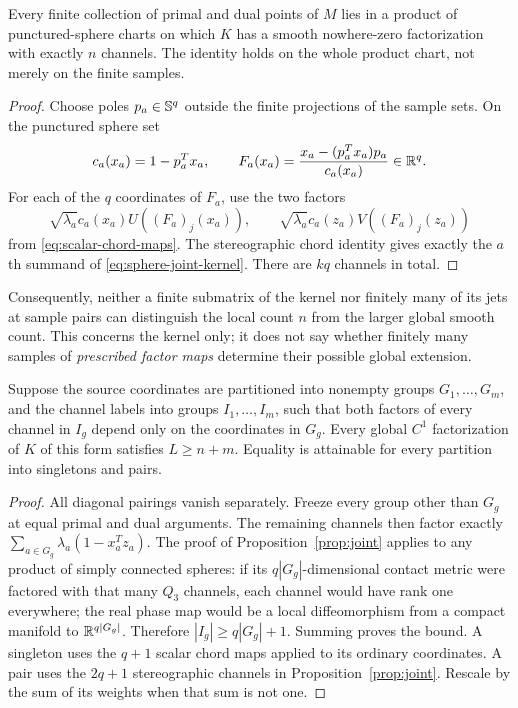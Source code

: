 \begin{proposition}\label{prop:local-saturation}
Every finite collection of primal and dual points of $M$ lies in a product
of punctured-sphere charts on which $K$ has a smooth nowhere-zero
factorization with exactly $n$ channels. The identity holds on the whole
product chart, not merely on the finite samples.
\end{proposition}
\begin{proof}
Choose poles $p_a\in\mathbb S^q$ outside the finite projections of the sample
sets. On the punctured sphere set
\[
 c_a(x_a)=1-p_a^Tx_a,\qquad
 F_a(x_a)=\frac{x_a-(p_a^Tx_a)p_a}{c_a(x_a)}\in\mathbb R^q.
\]
For each of the $q$ coordinates of $F_a$, use the two factors
\[
 \sqrt{\lambda_a}c_a(x_a)U((F_a)_j(x_a)),\qquad
 \sqrt{\lambda_a}c_a(z_a)V((F_a)_j(z_a))
\]
from \eqref{eq:scalar-chord-maps}. The stereographic chord identity gives
exactly the $a$th summand of \eqref{eq:sphere-joint-kernel}. There are
$kq$ channels in total.
\end{proof}
Consequently, neither a finite submatrix of the kernel nor finitely many
of its jets at sample pairs can distinguish the local count $n$ from the
larger global smooth count. This concerns the kernel only; it does not
say whether finitely many samples of
\emph{prescribed factor maps} determine their possible global extension.

\begin{proposition}\label{prop:partition-channels}
Suppose the source coordinates are partitioned into nonempty groups
$G_1,\ldots,G_m$, and the channel labels into groups $I_1,\ldots,I_m$,
such that both factors of every channel in $I_g$ depend only on the
coordinates in $G_g$. Every global $C^1$ factorization of $K$ of this form
satisfies $L\geq n+m$. Equality is attainable for every partition into
singletons and pairs.
\end{proposition}
\begin{proof}
All diagonal pairings vanish separately. Freeze every group other than
$G_g$ at equal primal and dual arguments. The remaining channels then
factor exactly $\sum_{a\in G_g}\lambda_a(1-x_a^Tz_a)$.
The proof of Proposition~\ref{prop:joint} applies to any product of
simply connected spheres: if its $q|G_g|$-dimensional contact metric were
factored with that many $Q_3$ channels, each channel would have rank one
everywhere; the real phase map would be a local diffeomorphism from a
compact manifold to $\mathbb R^{q|G_g|}$. Therefore
$|I_g|\geq q|G_g|+1$. Summing proves the bound. A singleton uses the
$q+1$ scalar chord maps applied to its ordinary coordinates. A pair uses
the $2q+1$ stereographic channels in Proposition~\ref{prop:joint}.
Rescale by the sum of its weights when that sum is not one.
\end{proof}


